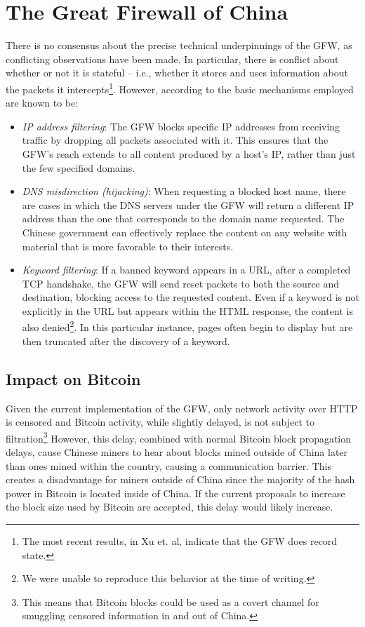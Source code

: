 \section{The Great Firewall of China}
There is no consensus about the precise technical underpinnings of the GFW, as conflicting observations have been made. In particular, there is conflict about whether or not it is stateful -- i.e., whether it stores and uses information about the packets it intercepts\footnote{The most recent results, in Xu et. al\cite{Xu2011}, indicate that the GFW does record state.}. However, according to \cite{GFWStanford} the basic mechanisms employed are known to be:

\begin{itemize}
\item \textit{IP address filtering}:
The GFW blocks specific IP addresses from receiving traffic by dropping all packets associated with it. This ensures that the GFW's reach extends to all content produced by a host's IP, rather than just the few specified domains.

\item \textit{DNS misdirection (hijacking)}:
When requesting a blocked host name, there are cases in which the DNS servers under the GFW will return a different IP address than the one that corresponds to the domain name requested. The Chinese government can effectively replace the content on any website with material that is more favorable to their interests.

\item \textit{Keyword filtering}:
If a banned keyword appears in a URL, after a completed TCP handshake, the GFW will send reset packets to both the source and destination, blocking access to the requested content. Even if a keyword is not explicitly in the URL but appears within the HTML response, the content is also denied\footnote{We were unable to reproduce this behavior at the time of writing.}. In this particular instance, pages often begin to display but are then truncated after the discovery of a keyword.
\end{itemize}

\subsection{Impact on Bitcoin}
Given the current implementation of the GFW, only network activity over HTTP is censored and Bitcoin activity, while slightly delayed, is not subject to filtration\footnote{This means that Bitcoin blocks could be used as a covert channel for smuggling censored information in and out of China.} However, this delay, combined with normal Bitcoin block propagation delays, cause Chinese miners to hear about blocks mined outside of China later than ones mined within the country, causing a communication barrier. This creates a disadvantage for miners outside of China since the majority of the hash power in Bitcoin is located inside of China. If the current proposals to increase the block size used by Bitcoin are accepted, this delay would likely increase.  \cite{nasdaq}
